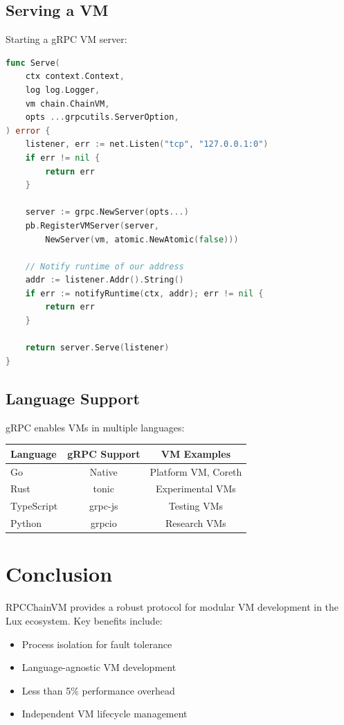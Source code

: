 \documentclass[11pt,letterpaper]{article}
\begin{document}
\subsection{Serving a VM}

Starting a gRPC VM server:

\begin{lstlisting}[language=Go, caption=VM Server Entry Point]
func Serve(
    ctx context.Context,
    log log.Logger,
    vm chain.ChainVM,
    opts ...grpcutils.ServerOption,
) error {
    listener, err := net.Listen("tcp", "127.0.0.1:0")
    if err != nil {
        return err
    }

    server := grpc.NewServer(opts...)
    pb.RegisterVMServer(server,
        NewServer(vm, atomic.NewAtomic(false)))

    // Notify runtime of our address
    addr := listener.Addr().String()
    if err := notifyRuntime(ctx, addr); err != nil {
        return err
    }

    return server.Serve(listener)
}
\end{lstlisting}

\subsection{Language Support}

gRPC enables VMs in multiple languages:

\begin{center}
\begin{tabular}{lcc}
\toprule
\textbf{Language} & \textbf{gRPC Support} & \textbf{VM Examples} \\
\midrule
Go & Native & Platform VM, Coreth \\
Rust & tonic & Experimental VMs \\
TypeScript & grpc-js & Testing VMs \\
Python & grpcio & Research VMs \\
\bottomrule
\end{tabular}
\end{center}

\section{Conclusion}

RPCChainVM provides a robust protocol for modular VM development in the Lux ecosystem. Key benefits include:

\begin{itemize}
    \item Process isolation for fault tolerance
    \item Language-agnostic VM development
    \item Less than 5\% performance overhead
    \item Independent VM lifecycle management
\end{itemize}
\end{document}
